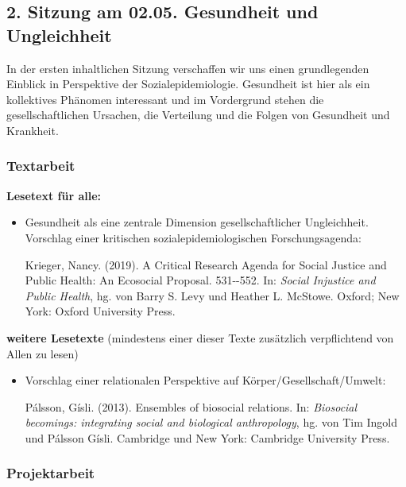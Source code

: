 \documentclass[
  ngerman,
]{article}
\begin{document}
\hypertarget{sitzung-am-02.05.-gesundheit-und-ungleichheit}{%
\subsection*{2. Sitzung am 02.05. \textbar{} Gesundheit und Ungleichheit}\label{sitzung-am-02.05.-gesundheit-und-ungleichheit}}

In der ersten inhaltlichen Sitzung verschaffen wir uns einen grundlegenden Einblick in Perspektive der Sozialepidemiologie. Gesundheit ist hier als ein kollektives Phänomen interessant und im Vordergrund stehen die gesellschaftlichen Ursachen, die Verteilung und die Folgen von Gesundheit und Krankheit.

\hypertarget{textarbeit-1}{%
\subsubsection*{Textarbeit}\label{textarbeit-1}}

\textbf{Lesetext für alle:}

\begin{itemize}
\item
  Gesundheit als eine zentrale Dimension gesellschaftlicher Ungleichheit. Vorschlag einer kritischen sozialepidemiologischen Forschungsagenda:

  Krieger, Nancy. (2019). A Critical Research Agenda for Social Justice and Public Health: An Ecosocial Proposal. 531-\/-552. In: \emph{Social Injustice and Public Health}, hg. von Barry S. Levy und Heather L. McStowe. Oxford; New York: Oxford University Press.
\end{itemize}

\textbf{weitere Lesetexte}
(mindestens einer dieser Texte zusätzlich verpflichtend von Allen zu lesen)

\begin{itemize}
\item
  Vorschlag einer relationalen Perspektive auf Körper/Gesellschaft/Umwelt:

  Pálsson, Gísli. (2013). Ensembles of biosocial relations. In: \emph{Biosocial becomings: integrating social and biological anthropology}, hg. von Tim Ingold und Pálsson Gísli. Cambridge und New York: Cambridge University Press.
\end{itemize}

\hypertarget{projektarbeit}{%
\subsubsection*{Projektarbeit}\label{projektarbeit}}
\end{document}
